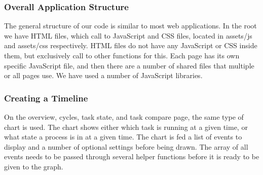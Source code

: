 \documentclass{hmcclinic}
\begin{document}
  \subsubsection{Overall Application Structure}

  The general structure of our code is similar to
  most web applications. In the root we have HTML files, which call to
  JavaScript and CSS files, located in assets/js and assets/css respectively.
  HTML files do not have any JavaScript or CSS inside them, but exclusively call
  to other functions for this. Each page has its own specific JavaScript file,
  and then there are a number of shared files that multiple or all pages use. We
  have used a number of JavaScript libraries.
  \subsubsection{Creating a Timeline}
  On the overview, cycles, task state, and task compare page, the same type of
  chart is used. The chart shows either which task is running at a given time,
  or what state a process is in at a given time. The chart is fed a list of
  events to display and a number of optional settings before being drawn. The
  array of all events needs to be passed through several helper functions
  before it is ready to be given to the graph.
  
\end{document}
